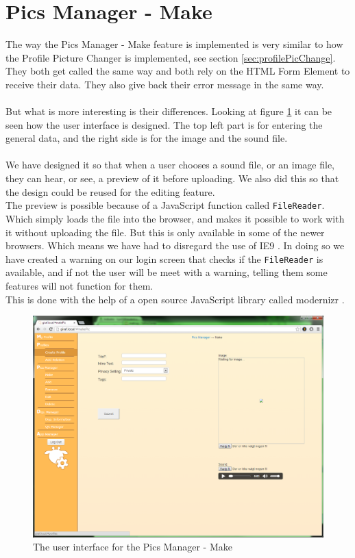 \section{Pics Manager - Make}
The way the Pics Manager - Make feature is implemented is very similar to how the Profile Picture Changer is implemented, see section \ref{sec:profilePicChange}.\\
They both get called the same way and both rely on the HTML Form Element to receive their data. They also give back their error message in the same way.\\
\\
But what is more interesting is their differences. Looking at figure \ref{fig:picsManagerMake} it can be seen how the user interface is designed. The top left part is for entering the general data, and the right side is for the image and the sound file.\\
\\
We have designed it so that when a user chooses a sound file, or an image file, they can hear, or see, a preview of it before uploading. We also did this so that the design could be reused for the editing feature.\\
The preview is possible because of a JavaScript function called \texttt{FileReader}. Which simply loads the file into the browser, and makes it possible to work with it without uploading the file. But this is only available in some of the newer browsers. Which means we have had to disregard the use of IE9 \citep{canIUse}. In doing so we have created a warning on our login screen that checks if the \texttt{FileReader} is available, and if not the user will be meet with a warning, telling them some features will not function for them.\\
This is done with the help of a open source JavaScript library called modernizr \citep{modernizr}.
\\
\begin{figure}[htbp]
	\centering
		\includegraphics[width=1\textwidth]{images/picsManagerMake.png}
	\caption{The user interface for the Pics Manager - Make}
	\label{fig:picsManagerMake}
\end{figure}

